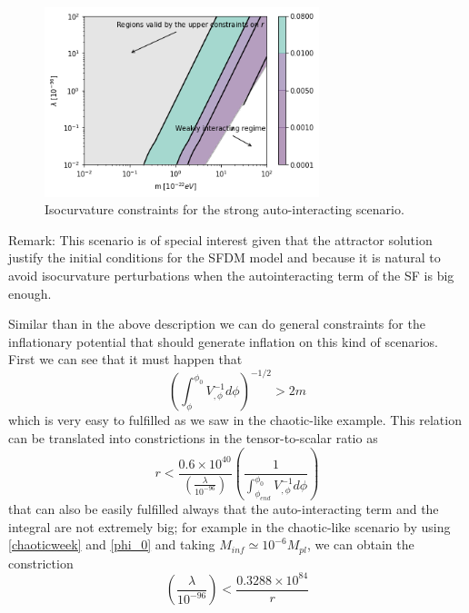\documentclass[amssymb,twocolumn,prd,nofootinbib,showpacs]{revtex4-1}
\begin{document}
\begin{figure}
\includegraphics[width=8cm]{stronglamb.png}
\caption{Isocurvature constraints for the strong auto-interacting scenario.}\label{constraintsSFDMls}
\end{figure} 

Remark: This scenario is of special interest given that the attractor solution justify the initial conditions for the SFDM model and because it is natural to avoid isocurvature perturbations when the autointeracting term of the SF is big enough. 

Similar than in the above description we can do general constraints for the inflationary potential that should generate inflation on this kind of scenarios. First we can see that it must happen that
\begin{equation}
\left(\int^{\phi_0}_\phi V_{,\phi}^{-1}d\phi\right)^{-1/2}>2m
\end{equation}
which is very easy to fulfilled as we saw in the chaotic-like example. This relation can be translated into constrictions in the tensor-to-scalar ratio as
\begin{equation}
r<\frac{0.6\times 10^{40}}{\left(\frac{\lambda}{10^{-96}}\right)}\left(\frac{1}{\int_{\phi_{end}}^{\phi_0}V_{,\phi}^{-1}d\phi}\right)
\end{equation}
that can also be easily fulfilled always that the auto-interacting term and the integral are not extremely big; for example in the chaotic-like scenario by using \eqref{chaoticweek} and \eqref{phi_0}
and taking $M_{inf}\simeq 10^{-6}M_{pl} $, we can obtain the constriction
\begin{equation}
\left(\frac{\lambda}{10^{-96}}\right)<\frac{0.3288\times 10^{84}}{r}
\end{equation}
\end{document}
